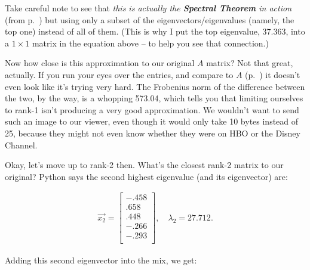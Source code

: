 \begin{alttitles}

Take careful note to see that \textit{this is actually the \textbf{Spectral
Theorem} in action} (from p.~\pageref{SpectralTheorem}) but using only a subset
of the eigenvectors/eigenvalues (namely, the top one) instead of all of them.
(This is why I put the top eigenvalue, 37.363, into a $1\times 1$ matrix in the
equation above -- to help you see that connection.)

\medskip

Now how close is this approximation to our original $A$ matrix? Not that great,
actually. If you run your eyes over the entries, and compare to $A$
(p.~\pageref{Amatrix}) it doesn't even look like it's trying very hard. The
Frobenius norm of the difference between the two, by the way, is a whopping
573.04, which tells you that limiting ourselves to rank-1 isn't producing a
very good approximation. We wouldn't want to send such an image to our viewer,
even though it would only take 10 bytes instead of 25, because they might not
even know whether they were on HBO or the Disney Channel.

\bigskip

Okay, let's move up to rank-2 then. What's the closest rank-2 matrix to our
original? Python says the second highest eigenvalue (and its eigenvector) are:

\vspace{-.15in}
\begin{align*}
\overrightarrow{x_2} = 
\begin{bmatrix}
-.458 \\ .658 \\ .448 \\ -.266 \\ -.293 \\
\end{bmatrix}, \quad
\lambda_2 = 27.712.
\end{align*}
\vspace{-.15in}

Adding this second eigenvector into the mix, we get:


\end{alttitles}
